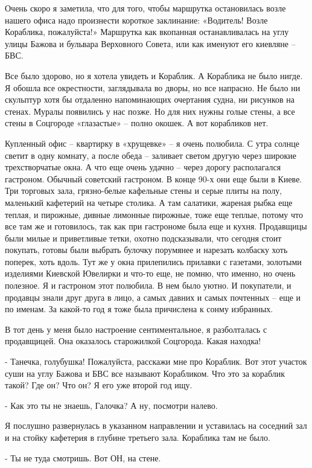 Очень скоро я заметила, что для того, чтобы маршрутка остановилась возле нашего
офиса надо произнести короткое заклинание: «Водитель! Возле Кораблика,
пожалуйста!» Маршрутка как вкопанная останавливалась на углу улицы Бажова и
бульвара Верховного Совета, или как именуют его киевляне – БВС. 

Все было здорово, но я хотела увидеть и Кораблик. А Кораблика не было нигде. Я
обошла все окрестности, заглядывала во дворы, но все напрасно. Не было ни
скульптур хотя бы отдаленно напоминающих очертания судна, ни рисунков на
стенах. Муралы появились у нас позже. Но для них нужны голые стены, а все стены
в Соцгороде «глазастые» – полно окошек. А вот корабликов нет. 

Купленный офис – квартирку в «хрущевке» – я очень полюбила. С утра солнце
светит в одну комнату, а после обеда – заливает светом другую через широкие
трехстворчатые окна. А что еще очень удачно – через дорогу располагался
гастроном. Обычный советский гастроном. В конце 90-х они еще были в Киеве. Три
торговых зала, грязно-белые кафельные стены и серые плиты на полу, маленький
кафетерий на четыре столика. А там салатики, жареная рыбка еще теплая, и
пирожные, дивные лимонные пирожные, тоже еще теплые, потому что все там же и
готовилось, так как при гастрономе была еще и кухня. Продавщицы были милые и
приветливые тетки, охотно подсказывали, что сегодня стоит покупать, готовы были
выбрать булочку порумянее и нарезать колбаску хоть поперек, хоть вдоль. Тут же
у окна прилепились прилавки с газетами, золотыми изделиями Киевской Ювелирки и
что-то еще, не помню, что именно, но очень полезное. Я и гастроном этот
полюбила. В нем было уютно. И покупатели, и продавцы знали друг друга в лицо, а
самых давних и самых почтенных – еще и по именам. За какой-то год я тоже была
причислена к сонму избранных.

В тот день у меня было настроение сентиментальное, я разболталась с
продавщицей. Она оказалось старожилкой Соцгорода. Какая находка! 

- Танечка, голубушка! Пожалуйста, расскажи мне про Кораблик. Вот этот участок
суши на углу Бажова и БВС все называют Корабликом. Что это за кораблик такой?
Где он? Что он? Я его уже второй год ищу. 

- Как это ты не знаешь, Галочка? А ну, посмотри налево.

Я послушно развернулась в указанном направлении и уставилась на соседний зал и
на стойку кафетерия в глубине третьего зала. Кораблика там не было. 

- Ты не туда смотришь. Вот ОН, на стене. 

